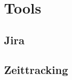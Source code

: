 
\section{Tools}\label{sec:tools}

\renewcommand{\kapitelautor}{Autor: Irgendwer} %

\subsection{Jira}\label{subsec:jira}

%
%

\subsection{Zeittracking}\label{subsec:zeittracking}

%
%

\renewcommand{\kapitelautor}{}
